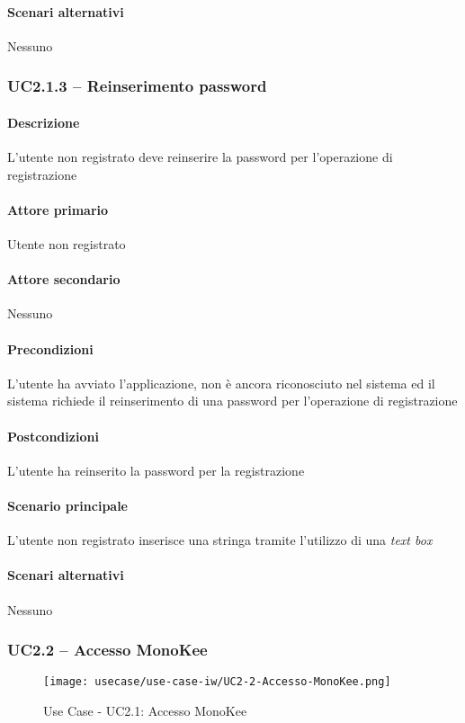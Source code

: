 \paragraph{Scenari alternativi}  Nessuno



\subsubsection{UC2.1.3 – Reinserimento password}
\paragraph{Descrizione}  L’utente non registrato deve reinserire la password per l’operazione di registrazione
\paragraph{Attore primario}  Utente non registrato
\paragraph{Attore secondario}  Nessuno
\paragraph{Precondizioni}  L’utente ha avviato l’applicazione, non è ancora riconosciuto nel sistema ed il sistema richiede il reinserimento di una password per l’operazione di registrazione
\paragraph{Postcondizioni}  L’utente ha reinserito la password per la registrazione
\paragraph{Scenario principale}  
L’utente non registrato inserisce una stringa tramite l’utilizzo di una \textit{text box}
\paragraph{Scenari alternativi}  Nessuno



\subsubsection{UC2.2 – Accesso MonoKee}
\begin{figure}[!htbp] 
    \centering 
    \texttt{[image: usecase/use-case-iw/UC2-2-Accesso-MonoKee.png]} 
    \caption{Use Case - UC2.1: Accesso MonoKee}
\end{figure}

